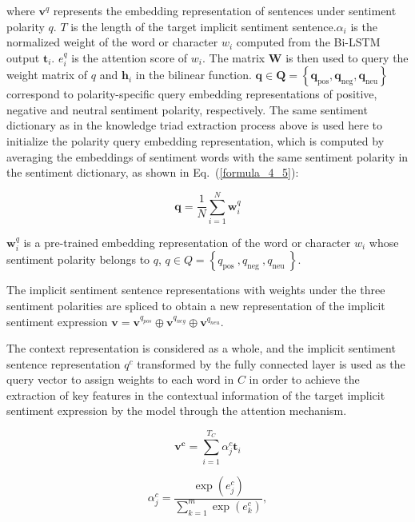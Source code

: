 where $ \boldsymbol{v}^q $ represents the embedding representation of sentences under sentiment polarity $q$. $T$ is the length of the target implicit sentiment sentence.$ \alpha_i$ is the normalized weight of the word or character $w_i$ computed from the Bi-LSTM output $ \boldsymbol{t}_i $. $ e^q_i$ is the attention score of $w_i$. The matrix $\boldsymbol{W}$ is then used to query the weight matrix of $q$ and $\boldsymbol{h}_i$ in the bilinear function. $\boldsymbol{q} \in \boldsymbol{Q}=\left\{\boldsymbol{q}_{\text{pos}}, \boldsymbol{q}_{\text{neg}}, \boldsymbol{q}_{\text{neu}}\right\}$ correspond to polarity-specific query embedding representations of positive, negative and neutral sentiment polarity, respectively. The same sentiment dictionary as in the knowledge triad extraction process above is used here to initialize the polarity query embedding representation, which is computed by averaging the embeddings of sentiment words with the same sentiment polarity in the sentiment dictionary, as shown in Eq.~(\ref{formula_4_5}):

\begin{equation}
    \boldsymbol{q}=\frac{1}{N} \sum_{i=1}^N \boldsymbol{w}_i^q
    \label{formula_4_5}
\end{equation}


$\boldsymbol{w}_i^q$ is a pre-trained embedding representation of the word or character $w_i$ whose sentiment polarity belongs to $q$, $q \in Q=\left\{q_{\text {pos }}, q_{\text {neg }}, q_{\text {neu }}\right\}$.

The implicit sentiment sentence representations with weights under the three sentiment polarities are spliced to obtain a new representation of the implicit sentiment expression $\boldsymbol{v}=\boldsymbol{v}^{q_{pos}} \oplus \boldsymbol{v}^{q_{neg}} \oplus \boldsymbol{v}^{q_{neu}}$.


The context representation is considered as a whole, and the implicit sentiment sentence representation $q^c$ transformed by the fully connected layer is used as the query vector to assign weights to each word in $C$ in order to achieve the extraction of key features in the contextual information of the target implicit sentiment expression by the model through the attention mechanism.


\begin{equation}
    \boldsymbol{v^c}=\sum_{i=1}^{T_C} \alpha_j^c \boldsymbol{t}_i
    \label{formula_4_6}
\end{equation}

\begin{equation}
    \alpha_j^c=\frac{\exp \left(e_j^c\right)}{\sum_{k=1}^m \exp \left(e_k^c\right)},
    \label{formula_4_7}
\end{equation}

